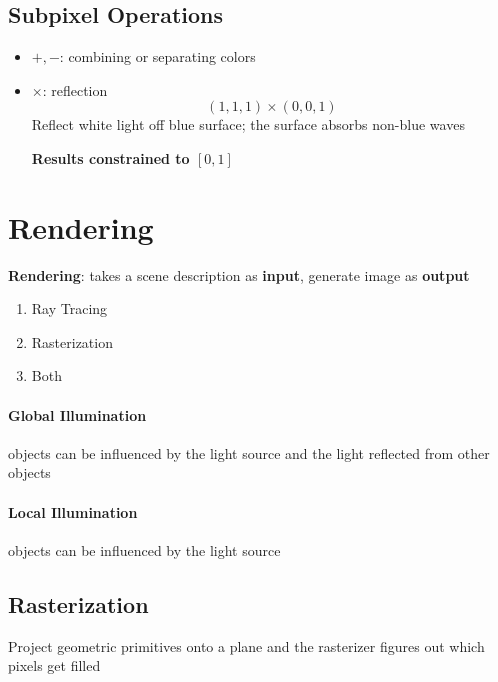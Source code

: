   \subsection{Subpixel Operations}

    \begin{itemize}
      \item $ +, - $: combining or separating colors
      \item $ \times $: reflection
      \begin{equation*}
        \left( 1, 1, 1 \right) \times \left( 0, 0, 1 \right)
      \end{equation*}
      Reflect white light off blue surface; the surface absorbs non-blue
      waves

      \textbf{Results constrained to $ \left[0, 1 \right] $}
    \end{itemize}

\section{Rendering}

  \textbf{Rendering}: takes a scene description as \textbf{input},
  generate image as \textbf{output}

  \begin{enumerate}
    \item Ray Tracing
    \item Rasterization
    \item Both
  \end{enumerate}

  \paragraph{Global Illumination} objects can be influenced by the light source
  and the light reflected from other objects

  \paragraph{Local Illumination} objects can be influenced by the light source

  \subsection{Rasterization}

    Project geometric primitives onto a plane and the rasterizer figures out
    which pixels get filled

